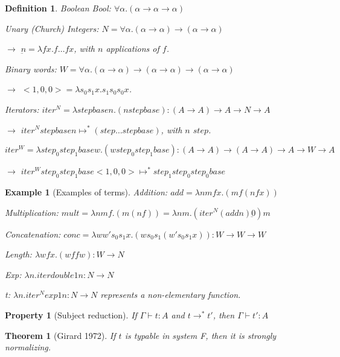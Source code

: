 \documentclass[a4paper,10pt]{article}
\newcommand{\impl}{\rightarrow}	%
\newtheorem{definition}{Definition}
\newtheorem{prop}{Property}
\newtheorem{thm}{Theorem}
\newtheorem{ex}{Example}
\begin{document}
\begin{definition}
\item Boolean Bool: $\forall \alpha.(\alpha \impl \alpha \impl \alpha)$
\item Unary (Church) Integers: $N = \forall \alpha.(\alpha \impl \alpha) \impl (\alpha \impl \alpha)$
\item[$\rightarrow$] $\underbar{n} = \lambda f x. f\dots f x$, with $n$ applications of $f$.
\item Binary words: $W = \forall \alpha.(\alpha \impl \alpha) \impl (\alpha \impl \alpha) \impl (\alpha \impl \alpha)$
\item[$\rightarrow$] $<1,0,0> = \lambda s_0 s_1 x. s_1 s_0 s_0 x$.
\vspace{0.2cm}

\item Iterators: $iter^{N} = \lambda step base n. (n step base) : (A \impl A) \impl A \impl N \impl A$
\item[$\rightarrow$] $iter^{N} step base n \mapsto^{*} (step \dots step base)$, with $n$ $step$.
\item $iter^{W} = \lambda step_0 step_1 base w. (w step_0 step_1 base) : (A \impl A) \impl (A \impl A) \impl A \impl W \impl A$
\item[$\rightarrow$] $iter^{W} step_0 step_1 base <1,0,0> \mapsto^{*} step_1 step_0 step_0 base$
\end{definition}

\begin{ex}[Examples of terms]
\item Addition: $add = \lambda n m f x.(m f (n f x))$
\item Multiplication: $mult = \lambda n m f. (m (n f)) = \lambda n m.(iter^N (add n) \underbar{0}) m$
\item Concatenation: $conc = \lambda w w' s_0 s_1 x. (w s_0 s_1 (w' s_0 s_1 x)) : W \impl W \impl W$
\item Length: $\lambda w f x.(w f f w): W \impl N$
\item Exp: $\lambda n. iter double 1 n : N \impl N$
\item t: $\lambda n.iter^N exp 1 n: N \impl N$ represents a non-elementary function.
\end{ex}

\begin{prop}[Subject reduction]
If $\Gamma \vdash t:A$ and $t \rightarrow^{*} t'$, then $\Gamma \vdash t':A$
\end{prop}

\begin{thm}[Girard 1972]
If $t$ is typable in system F, then it is strongly normalizing.
\end{thm}
\end{document}
